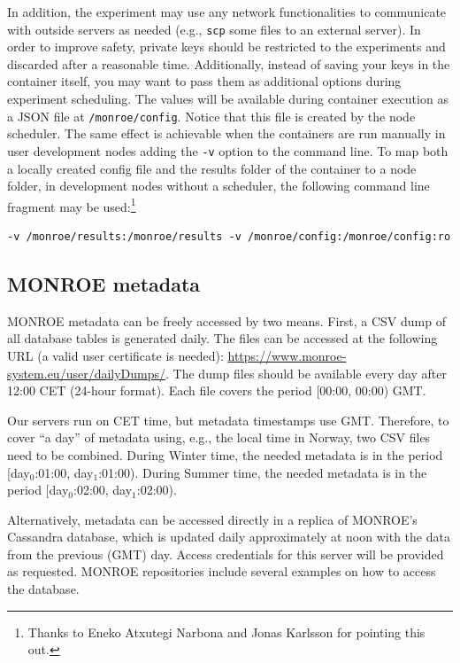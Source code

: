 \documentclass[a4paper,10pt]{article}
\newcommand{\monroe}{MONROE}
\newcommand{\identifier}[1]{{\texttt{\small{#1}}}}
\begin{document}
In addition, the experiment may use any network functionalities to communicate with outside servers as needed (e.g., \identifier{scp} some files to an external server).
In order to improve safety, private keys should be restricted to the experiments and discarded after a reasonable time.
Additionally, instead of saving your keys in the container itself, you may want to pass them as additional options during experiment scheduling.
The values will be available during container execution as a JSON file at \identifier{/monroe/config}.
Notice that this file is created by the node scheduler.
The same effect is achievable when the containers are run manually in user development nodes adding the \identifier{-v} option to the command line.
To map both a locally created config file and the results folder of the container to a node folder, in development nodes without a scheduler, the following command line fragment may be used:\footnote{Thanks to Eneko Atxutegi Narbona and Jonas Karlsson for pointing this out.}
\begin{verbatim}
-v /monroe/results:/monroe/results -v /monroe/config:/monroe/config:ro
\end{verbatim}

\subsection{\monroe{} metadata}

\monroe{} metadata can be freely accessed by two means.
First, a CSV dump of all database tables is generated daily.
The files can be accessed at the following URL (a valid user certificate is needed): \url{https://www.monroe-system.eu/user/dailyDumps/}.
The dump files should be available every day after 12:00 CET (24-hour format).
Each file covers the period [00:00, 00:00) GMT.

Our servers run on CET time, but metadata timestamps use GMT.
Therefore, to cover ``a day'' of metadata using, e.g., the local time in Norway, two CSV files need to be combined.
During Winter time, the needed metadata is in the period [day$_0$:01:00, day$_1$:01:00).
During Summer time, the needed metadata is in the period [day$_0$:02:00, day$_1$:02:00).

Alternatively, metadata can be accessed directly in a replica of \monroe{}'s Cassandra database, which is updated daily approximately at noon with the data from the previous (GMT) day.
Access credentials for this server will be provided as requested.
\monroe{} repositories include several examples on how to access the database.
\end{document}
